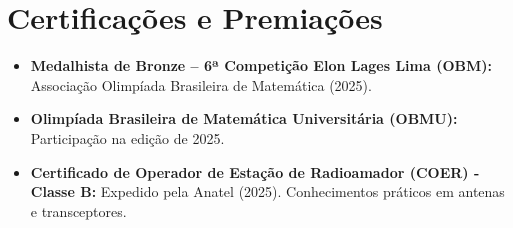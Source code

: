 \documentclass[11pt,a4paper]{article}
\begin{document}
\section*{Certificações e Premiações}
\begin{itemize}[leftmargin=*, noitemsep]
    \item \textbf{Medalhista de Bronze -- 6ª Competição Elon Lages Lima (OBM):} Associação Olimpíada Brasileira de Matemática (2025).
    \item \textbf{Olimpíada Brasileira de Matemática Universitária (OBMU):} Participação na edição de 2025.
    \item \textbf{Certificado de Operador de Estação de Radioamador (COER) - Classe B:} Expedido pela Anatel (2025). Conhecimentos práticos em antenas e transceptores.
\end{itemize}
\end{document}
